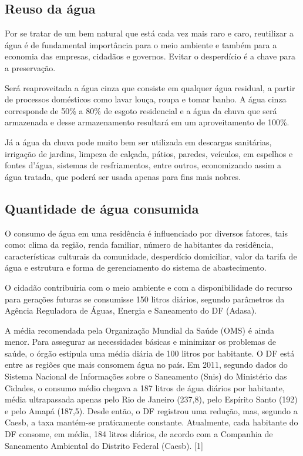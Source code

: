 \subsection{Reuso da água}

	Por se tratar de um bem natural que está cada vez mais raro e caro, reutilizar a água é de fundamental importância para o meio ambiente e também para a economia das empresas, cidadãos e governos. Evitar o desperdício é a chave para a preservação.
	
	Será reaproveitada a água cinza que consiste em qualquer água residual, a partir de processos domésticos como lavar louça, roupa e tomar banho. A água cinza corresponde de 50\% a 80\% de esgoto residencial e a água da chuva que será armazenada e desse armazenamento resultará em um aproveitamento de 100\%.

	Já a água da chuva pode muito bem ser utilizada em descargas sanitárias, irrigação de jardins, limpeza de calçada, pátios, paredes, veículos, em espelhos e fontes d’água, sistemas de resfriamentos, entre outros, economizando assim a água tratada, que poderá ser usada apenas para fins mais nobres.

\subsection{Quantidade de água consumida}

	O consumo de água em uma residência é influenciado por diversos fatores, tais como: clima da região, renda familiar, número de habitantes da residência, características culturais da comunidade, desperdício domiciliar, valor da tarifa de água e estrutura e forma de gerenciamento do sistema de abastecimento.

	O cidadão contribuiria com o meio ambiente e com a disponibilidade do recurso para gerações futuras se consumisse 150 litros diários, segundo parâmetros da Agência Reguladora de Águas, Energia e Saneamento do DF (Adasa).

	A média recomendada pela Organização Mundial da Saúde (OMS) é ainda menor. Para assegurar as necessidades básicas e minimizar os problemas de saúde, o órgão estipula uma média diária de 100 litros por habitante. O DF está entre as regiões que mais consomem água no país. Em 2011, segundo dados do Sistema Nacional de Informações sobre o Saneamento (Snis) do Ministério das Cidades, o consumo médio chegava a 187 litros de água diários por habitante, média ultrapassada apenas pelo Rio de Janeiro (237,8), pelo Espírito Santo (192) e pelo Amapá (187,5). Desde então, o DF registrou uma redução, mas, segundo a Caesb, a taxa mantém-se praticamente constante. Atualmente, cada habitante do DF consome, em média, 184 litros diários, de acordo com a Companhia de Saneamento Ambiental do Distrito Federal (Caesb). [1]

